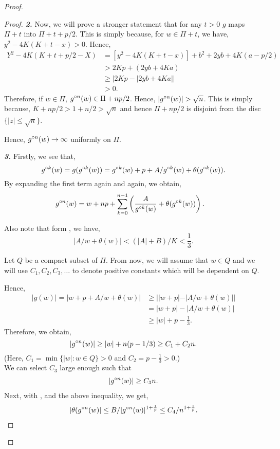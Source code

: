 \begin{proof}
\begin{proof}
	\noindent \textbf{\emph{2.}} Now, we will prove a stronger statement that for any \( t>0 \)
	\( g \) maps \( \Pi+t \) into \( \Pi+t+p /2 \). This is simply because, for \( w\in\Pi+t \),
	we have, \( y^2-4K(K+t-x)>0 \). Hence,
	\begin{align*}
		Y^2-4K(K+t+p /2-X)&=[y^2-4K(K+t-x)]+b^2+2yb+4K(a-p /2)\\
		&> 2Kp+(2yb+4Ka)\\
		&\ge |2Kp - |2yb+4Ka| |\\
		&>0
	.\end{align*}
	Therefore, if \( w\in\Pi \), \( \gog[n](w)\in \Pi+np /2 \). Hence, \( |\gog[n](w)|>\sqrt{n}  \).
	This is simply because, \( K+np /2>1+n /2>\sqrt{n}  \) and hence \( \Pi+np /2 \) is disjoint from the
disc \( \{|z|\le \sqrt{n} \} \).

Hence, \( \gog[n](w)\to \infty \) uniformly on \( \Pi \).\\
\vspace{1pt}

\noindent \textbf{\emph{3.}} Firstly, we see that, \[
	\gog[k](w)=g(\gog[k](w))=\gog[k](w)+p+A /\gog[k](w)+\theta (\gog[k](w))
.\] 
By expanding the first term again and again, we obtain,
\begin{align}
	\gog[n](w)&=w+np+ \sum_{k=0}^{n-1} \left(\frac{A}{\gog[k](w)}  +\theta(\gog[k](w))\right) \label{eqn3.4}
.\end{align}

Also note that form , we have, \[
	|A /w+\theta (w)|<(|A|+B) /K <\frac{1}{3}
.\] 

Let \( Q \) be a compact subset of \( \Pi \). From now, we will assume that \( w\in Q \) and we will use
\( C_1,C_2,C_3,\ldots  \) to denote positive constants which will be dependent on \( Q \).

Hence,
\begin{align*}
|g(w)|=|w+p+A /w+\theta (w)|&\ge ||w+p|-|A /w+\theta (w)| |\\
								&= |w+p|-|A /w+\theta (w)|\\
								&\ge |w|+p-\frac{1}{3}
.\end{align*}
Therefore, we obtain, \[
	|\gog[n](w)|\ge |w|+n(p-1 /3)\ge C_1+C_2n
.\] 
(Here, \( C_1=\min\{|w|:w\in Q\}>0 \) and \( C_2=p-\frac{1}{3}>0 \).)\\
We can select \( C_3 \) large enough such that
\begin{align}
	|\gog[n](w)|\ge C_3 n\label{eqn3.5}.
\end{align}
Next, with , and the above inequality, we get,
\begin{align}
	|\theta (\gog[n](w)|\le B /|\gog[n](w)|^{1+\frac{1}{p}}\le C_4 /n^{1+\frac{1}{p}}\label{eqn3.6}
.\end{align}


\end{proof}
\end{proof}
